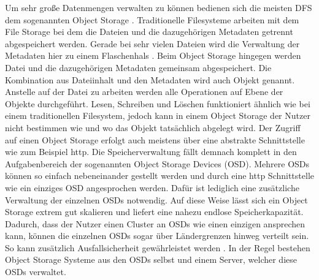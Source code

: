 \documentclass[12pt,oneside,a4paper,parskip]{scrbook}
\begin{document}
Um sehr große Datenmengen verwalten zu können bedienen sich die meisten DFS dem sogenannten Object Storage \cite{cephPaper}. Traditionelle Filesysteme arbeiten mit dem File Storage bei dem die Dateien und die dazugehörigen Metadaten getrennt abgespeichert werden. Gerade bei sehr vielen Dateien wird die Verwaltung der Metadaten hier zu einem Flaschenhals \cite{filestorage}. Beim Object Storage hingegen werden Datei und die dazugehörigen Metadaten gemeinsam abgespeichert. Die Kombination aus Dateiinhalt und den Metadaten wird auch Objekt genannt. Anstelle auf der Datei zu arbeiten werden alle Operationen auf Ebene der Objekte durchgeführt. Lesen, Schreiben und Löschen funktioniert ähnlich wie bei einem traditionellen Filesystem, jedoch kann in einem Object Storage der Nutzer nicht bestimmen wie und wo das Objekt tatsächlich abgelegt wird. Der Zugriff auf einen Object Storage erfolgt auch meistens über eine abstrakte Schnittstelle wie zum Beispiel http. Die Speicherverwaltung fällt demnach komplett in den Aufgabenbereich der sogenannten Object Storage Devices (OSD). Mehrere OSDs können so einfach nebeneinander gestellt werden und durch eine http Schnittstelle wie ein einziges OSD angesprochen werden. Dafür ist lediglich eine zusätzliche Verwaltung der einzelnen OSDs notwendig. Auf diese Weise lässt sich ein Object Storage extrem gut skalieren und liefert eine nahezu endlose Speicherkapazität. Dadurch, dass der Nutzer einen Cluster an OSDs wie einen einzigen ansprechen kann, können die einzelnen OSDs sogar über Ländergrenzen hinweg verteilt sein. So kann zusätzlich Ausfallsicherheit gewährleistet werden \cite{osvideo}\cite{objectstorage}\cite{objectBasedStorage}. In der Regel bestehen Object Storage Systeme aus den OSDs selbst und einem Server, welcher diese OSDs verwaltet.
\end{document}
